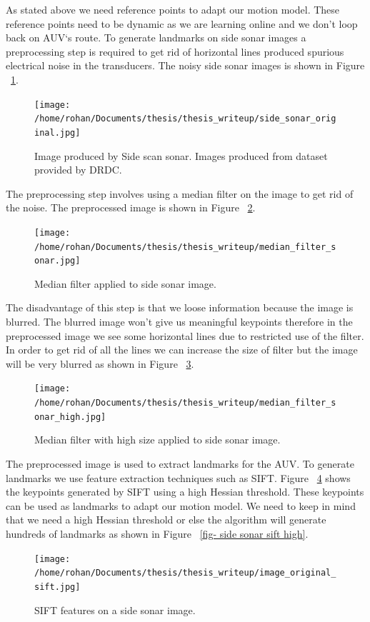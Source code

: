 \documentclass[12pt]{dalcsthesis}
\begin{document}
As stated above we need reference points to adapt our motion model. These reference points need to be dynamic as we are learning online and we don't loop back on AUV`s route. To generate landmarks on side sonar images a preprocessing step is required to get rid of horizontal lines produced spurious electrical noise in the transducers. The noisy side sonar images is shown in Figure ~\ref{fig- side sonar image original}.

\begin{figure}
  \centering
     {\texttt{[image: /home/rohan/Documents/thesis/thesis\_writeup/side\_sonar\_original.jpg]}}
  \caption{\label{fig- side sonar image original} Image produced by Side scan sonar. Images produced from dataset provided by DRDC.}
\end{figure}


The preprocessing step involves using a median filter on the image to get rid of the noise. The preprocessed image is shown in Figure ~\ref{fig- side sonar median}.
\begin{figure}
  \centering
     {\texttt{[image: /home/rohan/Documents/thesis/thesis\_writeup/median\_filter\_sonar.jpg]}}
  \caption{\label{fig- side sonar median} Median filter applied to side sonar image.}
\end{figure}

The disadvantage of this step is that we loose information because the image is blurred. The blurred image won't give us meaningful keypoints therefore in the preprocessed image we see some horizontal lines due to restricted use of the filter. In order to get rid of all the lines we can increase the size of filter but the image will be very blurred as shown in Figure ~\ref{fig- side sonar median high}.
\begin{figure}
  \centering
     {\texttt{[image: /home/rohan/Documents/thesis/thesis\_writeup/median\_filter\_sonar\_high.jpg]}}
  \caption{\label{fig- side sonar median high} Median filter with high size applied to side sonar image.}
\end{figure}

The preprocessed image is used to extract landmarks for the AUV. To generate landmarks we use feature extraction techniques such as SIFT. Figure ~\ref{fig- side sonar sift} shows the keypoints generated by SIFT using a high Hessian threshold. These keypoints can be used as landmarks to adapt our motion model. We need to keep in mind that we need a high Hessian threshold or else the algorithm will generate hundreds of landmarks as shown in Figure ~\ref{fig- side sonar sift high}.
\begin{figure}
  \centering
     {\texttt{[image: /home/rohan/Documents/thesis/thesis\_writeup/image\_original\_sift.jpg]}}
  \caption{\label{fig- side sonar sift} SIFT features on a side sonar image.}
\end{figure}
\end{document}
